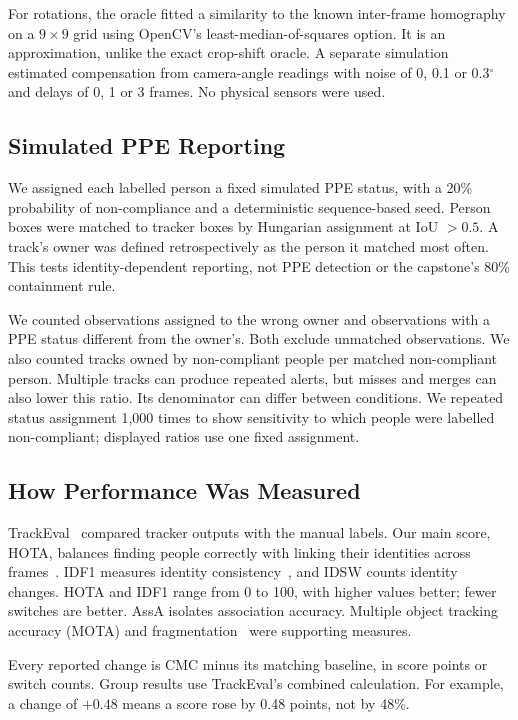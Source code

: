 \documentclass[conference]{IEEEtran}
\begin{document}
For rotations, the oracle fitted a similarity to the known inter-frame homography on a $9\times9$ grid using OpenCV's least-median-of-squares option. It is an approximation, unlike the exact crop-shift oracle. A separate simulation estimated compensation from camera-angle readings with noise of 0, 0.1 or 0.3$^\circ$ and delays of 0, 1 or 3 frames. No physical sensors were used.

\subsection{Simulated PPE Reporting}
We assigned each labelled person a fixed simulated PPE status, with a 20\% probability of non-compliance and a deterministic sequence-based seed. Person boxes were matched to tracker boxes by Hungarian assignment at IoU $>0.5$. A track's owner was defined retrospectively as the person it matched most often. This tests identity-dependent reporting, not PPE detection or the capstone's 80\% containment rule.

We counted observations assigned to the wrong owner and observations with a PPE status different from the owner's. Both exclude unmatched observations. We also counted tracks owned by non-compliant people per matched non-compliant person. Multiple tracks can produce repeated alerts, but misses and merges can also lower this ratio. Its denominator can differ between conditions. We repeated status assignment 1,000 times to show sensitivity to which people were labelled non-compliant; displayed ratios use one fixed assignment.

\subsection{How Performance Was Measured}
TrackEval~\cite{luiten2020trackeval} compared tracker outputs with the manual labels. Our main score, HOTA, balances finding people correctly with linking their identities across frames~\cite{luiten2021hota}. IDF1 measures identity consistency~\cite{ristani2016idf1}, and IDSW counts identity changes. HOTA and IDF1 range from 0 to 100, with higher values better; fewer switches are better. AssA isolates association accuracy. Multiple object tracking accuracy (MOTA) and fragmentation~\cite{bernardin2008clear} were supporting measures.

Every reported change is CMC minus its matching baseline, in score points or switch counts. Group results use TrackEval's combined calculation. For example, a change of $+0.48$ means a score rose by 0.48 points, not by 48\%.
\end{document}
